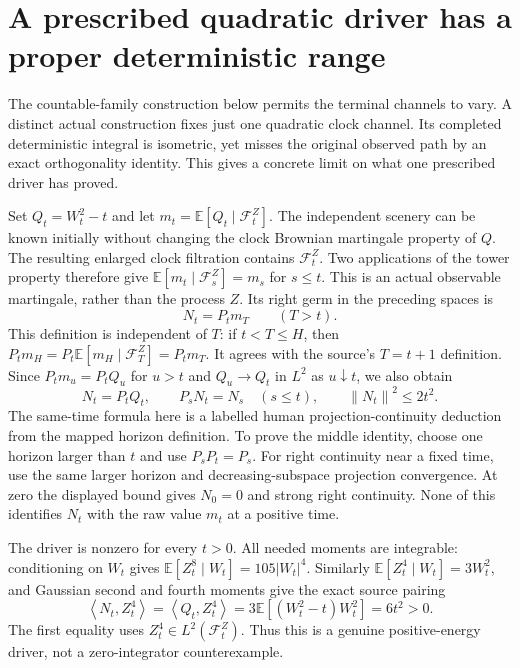 \documentclass[11pt]{article}
\theoremstyle{remark}\newtheorem{remark}[theorem]{Remark}
\newcommand{\E}{\mathbb E}
\newcommand{\norm}[1]{\left\lVert#1\right\rVert}
\newcommand{\inner}[2]{\left\langle#1,#2\right\rangle}
\begin{document}
\section{A prescribed quadratic driver has a proper deterministic range}
\label{sec:deterministicrange}
The countable-family construction below permits the terminal channels to
vary. A distinct actual construction fixes just one quadratic clock
channel. Its completed deterministic integral is isometric, yet misses
the original observed path by an exact orthogonality identity. This gives
a concrete limit on what one prescribed driver has proved.

Set $Q_t=W_t^2-t$ and let $m_t=\E[Q_t\mid\mathcal F_t^Z]$.
The independent scenery can be known initially without changing the
clock Brownian martingale property of $Q$. The resulting enlarged clock
filtration contains $\mathcal F_t^Z$. Two applications of the tower
property therefore give $\E[m_t\mid\mathcal F_s^Z]=m_s$ for $s\leq t$.
This is an actual observable martingale, rather than the process $Z$.
Its right germ in the preceding spaces is
\[
 N_t=P_t m_T\qquad(T>t).
\]
This definition is independent of $T$: if $t<T\leq H$, then
$P_tm_H=P_t\E[m_H\mid\mathcal F_T^Z]=P_tm_T$.
It agrees with the source's $T=t+1$ definition. Since
$P_t m_u=P_tQ_u$ for $u>t$ and $Q_u\to Q_t$ in $L^2$ as
$u\downarrow t$, we also obtain
\begin{equation}\label{eq:quadraticgerm}
 N_t=P_tQ_t,\qquad P_sN_t=N_s\quad(s\leq t),\qquad
 \norm{N_t}^2\leq2t^2.
\end{equation}
The same-time formula here is a labelled human projection-continuity
deduction from the mapped horizon definition. To prove the middle
identity, choose one horizon larger than $t$ and use $P_sP_t=P_s$.
For right continuity near a fixed time, use the same larger horizon
and decreasing-subspace projection convergence. At zero the displayed
bound gives $N_0=0$ and strong right continuity. None of this identifies
$N_t$ with the raw value $m_t$ at a positive time.

The driver is nonzero for every $t>0$. All needed moments are integrable:
conditioning on $W_t$ gives $\E[Z_t^8\mid W_t]=105|W_t|^4$.
Similarly $\E[Z_t^4\mid W_t]=3W_t^2$, and Gaussian second and
fourth moments give the exact source pairing
\begin{equation}\label{eq:quadraticfourth}
 \inner{N_t}{Z_t^4}=\inner{Q_t}{Z_t^4}
 =3\E[(W_t^2-t)W_t^2]=6t^2>0.
\end{equation}
The first equality uses $Z_t^4\in L^2(\mathcal F_t^Z)$.
Thus this is a genuine positive-energy driver, not a zero-integrator
counterexample.
\end{document}
